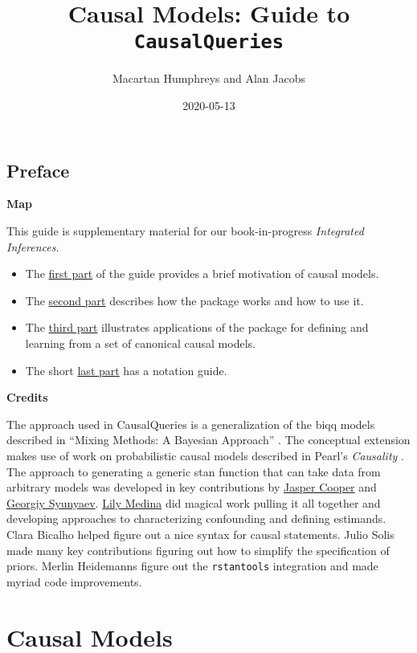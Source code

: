\documentclass[
  12pt,
]{book}
\title{Causal Models: Guide to \texttt{CausalQueries}}
\author{Macartan Humphreys and Alan Jacobs}
\date{2020-05-13}
\providecommand{\tightlist}{%
  \setlength{\itemsep}{0pt}\setlength{\parskip}{0pt}}
\begin{document}
\maketitle

{
\setcounter{tocdepth}{1}
\tableofcontents
}
\hypertarget{preface}{%
\chapter*{Preface}\label{preface}}

\textbf{Map}

This guide is supplementary material for our book-in-progress \emph{Integrated Inferences}.

\begin{itemize}
\tightlist
\item
  The \protect\hyperlink{cm}{first part} of the guide provides a brief motivation of causal models.
\item
  The \protect\hyperlink{package}{second part} describes how the package works and how to use it.
\item
  The \protect\hyperlink{applications}{third part} illustrates applications of the package for defining and learning from a set of canonical causal models.
\item
  The short \protect\hyperlink{notation}{last part} has a notation guide.
\end{itemize}

\textbf{Credits}

The approach used in CausalQueries is a generalization of the biqq models described in ``Mixing Methods: A Bayesian Approach'' \citep{humphreys2015mixing}. The conceptual extension makes use of work on probabilistic causal models described in Pearl's \emph{Causality} \citep{pearl2009causality}. The approach to generating a generic stan function that can take data from arbitrary models was developed in key contributions by \href{http://jasper-cooper.com/}{Jasper Cooper} and \href{http://gsyunyaev.com/}{Georgiy Syunyaev}. \href{https://lilymedina.github.io/}{Lily Medina} did magical work pulling it all together and developing approaches to characterizing confounding and defining estimands. Clara Bicalho helped figure out a nice syntax for causal statements. Julio Solis made many key contributions figuring out how to simplify the specification of priors. Merlin Heidemanns figure out the \texttt{rstantools} integration and made myriad code improvements.

\hypertarget{part-causal-models}{%
\part{Causal Models}\label{part-causal-models}}
\end{document}
